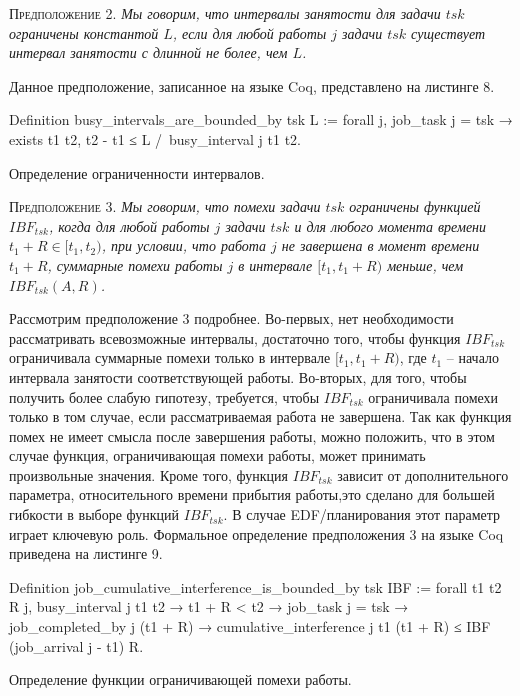 \documentclass[14pt]{matmex-diploma-custom}
\begin{document}
\textsc{Предположение 2.}
\textit{Мы говорим, что интервалы занятости для задачи $tsk$ ограничены константой $L$, 
  если для любой работы $j$ задачи $tsk$ существует интервал занятости с длинной не более, чем $L$. }

Данное предположение, записанное на языке Coq, представлено на листинге 8.  


\begin{listing} 
\begin{pyglist}[numbers=none,numbersep=5pt, fontsize=\small]
  Definition busy_intervals_are_bounded_by tsk L :=
    forall j,
      job_task j = tsk →
      exists t1 t2,
        t2 - t1 ≤ L /\
        busy_interval j t1 t2.
\end{pyglist}
\caption{Определение ограниченности интервалов. }
\label{lst:theorem2}   
\end{listing}

\textsc{Предположение 3.}
\textit{Мы говорим, что помехи задачи $tsk$ ограничены функцией $IBF_{tsk}$, 
  когда для любой работы $j$ задачи $tsk$ и для любого момента времени $t_1 + R \in [t_1, t_2)$, 
  при условии, что работа $j$ не завершена в момент времени $t_1 + R$, 
  суммарные помехи работы $j$ в интервале $[t_1, t_1 + R)$ меньше, чем $IBF_{tsk}(A, R)$. }

 Рассмотрим предположение 3 подробнее. Во-первых, 
  нет необходимости рассматривать всевозможные интервалы, 
  достаточно того, чтобы функция $IBF_{tsk}$ ограничивала суммарные помехи только в интервале 
  $[t_1, t_1 + R)$, где $t_1$ -- начало интервала занятости соответствующей работы. 
  Во-вторых, для того, чтобы получить более слабую гипотезу, требуется, чтобы $IBF_{tsk}$ 
  ограничивала помехи только в том случае, если рассматриваемая работа не завершена. 
  Так как функция помех не имеет смысла после завершения работы, можно положить, 
  что в этом случае функция, ограничивающая помехи работы, может принимать произвольные значения.
  Кроме того, функция $IBF_{tsk}$ зависит от дополнительного параметра, 
  относительного времени прибытия работы,это сделано для большей гибкости в выборе функций $IBF_{tsk}$. 
  В случае EDF\-/планирования этот параметр играет ключевую роль. Формальное
  определение предположения 3 на языке Coq приведена на листинге 9. 
  
\begin{listing} 
\begin{pyglist}[numbers=none,numbersep=5pt, fontsize=\small]
  Definition job_cumulative_interference_is_bounded_by tsk IBF :=
    forall t1 t2 R j,
      busy_interval j t1 t2 →
      t1 + R < t2 → 
      job_task j = tsk →
      ~~ job_completed_by j (t1 + R) →
      cumulative_interference j t1 (t1 + R) 
          ≤ IBF (job_arrival j - t1) R.
\end{pyglist}
\caption{Определение функции ограничивающей помехи работы. }
\label{lst:theorem2}   
\end{listing}
\end{document}
